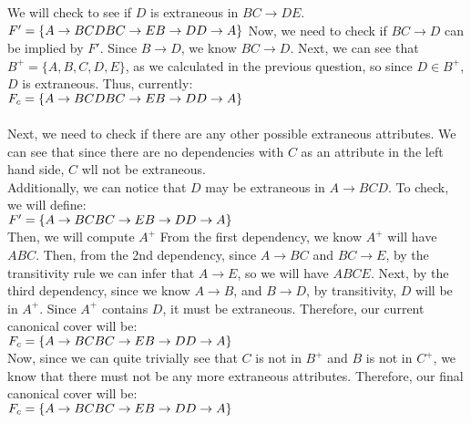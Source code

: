 \documentclass[a4 paper]{article}
\begin{document}
We will check to see if $D$ is extraneous in $BC\rightarrow DE$.\\
$F'=\{\\
A\rightarrow BCD\\
BC\rightarrow E\\
B\rightarrow D\\
D\rightarrow A\}$
Now, we need to check if $BC\rightarrow D$ can be implied by $F'$. Since $B\rightarrow D$, we know $BC\rightarrow D$.
Next, we can see that $B^+=\{A,B,C,D,E\}$, as we calculated in the previous question, so since $D\in B^+$, $D$ is extraneous. Thus, currently:\\
$F_c=\{\\
A\rightarrow BCD\\
BC\rightarrow E\\
B\rightarrow D\\
D\rightarrow A\}$
\\\\
Next, we need to check if there are any other possible extraneous attributes. We can see that since there are no dependencies with $C$ as an attribute in the left hand side, $C$ wll not be extraneous.\\
Additionally, we can notice that $D$ may be extraneous in $A\rightarrow BCD$. To check, we will define:\\
$F'=\{\\
A\rightarrow BC\\
BC\rightarrow E\\
B\rightarrow D\\
D\rightarrow A\}$\\
Then, we will compute $A^+$
From the first dependency, we know $A^+$ will have $ABC$. Then, from the 2nd dependency, since $A\rightarrow BC$ and $BC\rightarrow E$, by the transitivity rule we can infer that $A\rightarrow E$, so we will have $ABCE$. Next, by the third dependency, since we know $A\rightarrow B$, and $B\rightarrow D$, by transitivity, $D$ will be in $A^+$. Since $A^+$ contains $D$, it must be extraneous. Therefore, our current canonical cover will be:\\
$F_c=\{\\
A\rightarrow BC\\
BC\rightarrow E\\
B\rightarrow D\\
D\rightarrow A\}$\\

Now, since we can quite trivially see that $C$ is not in $B^+$ and $B$ is not in $C^+$, we know that there must not be any more extraneous attributes. Therefore, our final canonical cover will be:\\
$F_c=\{\\
A\rightarrow BC\\
BC\rightarrow E\\
B\rightarrow D\\
D\rightarrow A\}$\\
\end{document}
